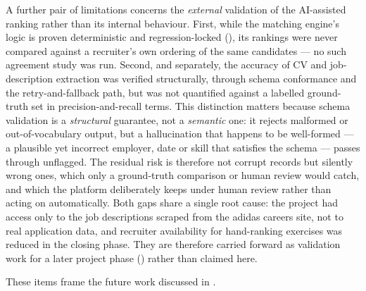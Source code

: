 A further pair of limitations concerns the \emph{external} validation of the
AI-assisted ranking rather than its internal behaviour. First, while the
matching engine's logic is proven deterministic and regression-locked
(), its rankings were never compared against a recruiter's
own ordering of the same candidates --- no such agreement study was run.
Second, and separately, the accuracy of CV and job-description extraction was
verified structurally, through schema conformance and the retry-and-fallback
path, but was not quantified against a labelled ground-truth set in
precision-and-recall terms. This distinction matters because schema validation
is a \emph{structural} guarantee, not a \emph{semantic} one: it rejects
malformed or out-of-vocabulary output, but a \gls{hallucination} that happens
to be well-formed --- a plausible yet incorrect employer, date or skill that
satisfies the schema --- passes through unflagged. The residual risk is
therefore not corrupt records but silently wrong ones, which only a
ground-truth comparison or human review would catch, and which the platform
deliberately keeps under human review rather than acting on automatically.
Both gaps share a single root cause: the project
had access only to the job descriptions scraped from the adidas careers site,
not to real application data, and recruiter availability for hand-ranking
exercises was reduced in the closing phase. They are therefore carried forward
as validation work for a later project phase () rather
than claimed here.

These items frame the future work discussed in
.
